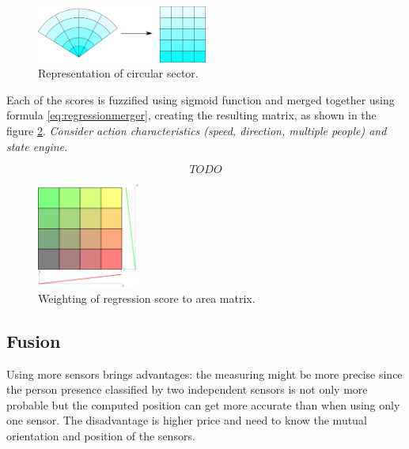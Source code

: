 \begin{figure}[h!]
\begin{center}
\includegraphics[width=0.5\textwidth]{img/circularsector_transformation.png}
\caption{Representation of circular sector.\label{fig:circularsector}}
\end{center}
\end{figure}

Each of the scores is fuzzified using sigmoid function and merged together using formula \ref{eq:regressionmerger},
creating the resulting matrix, as shown in the figure \ref{fig:areamatrixweighting}. {\it Consider action characteristics (speed, direction, multiple people) and state engine.}

\begin{equation}
TODO
\label{eq:regressionmerger}
\end{equation}



\begin{figure}[h!]
\begin{center}
\includegraphics[width=0.3\textwidth]{img/pir_area.png}
\caption{Weighting of regression score to area matrix.\label{fig:areamatrixweighting}}
\end{center}
\end{figure}

\subsection*{Fusion}
Using more sensors brings advantages: the measuring might be more precise since the person presence
classified by two independent sensors is not only more probable but the computed position
can get more accurate than when using only one sensor. The disadvantage is higher price and need
to know the mutual orientation and position of the sensors. 

